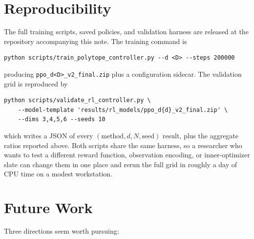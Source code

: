 \documentclass[11pt]{article}
\begin{document}
\section{Reproducibility}

The full training scripts, saved policies, and validation harness
are released at the repository accompanying this note.  The
training command is
\begin{verbatim}
python scripts/train_polytope_controller.py --d <D> --steps 200000
\end{verbatim}
producing \texttt{ppo\_d<D>\_v2\_final.zip} plus a configuration
sidecar.  The validation grid is reproduced by
\begin{verbatim}
python scripts/validate_rl_controller.py \
    --model-template 'results/rl_models/ppo_d{d}_v2_final.zip' \
    --dims 3,4,5,6 --seeds 10
\end{verbatim}
which writes a JSON of every $(\text{method}, d, N, \text{seed})$
result, plus the aggregate ratios reported above.  Both scripts
share the same harness, so a researcher who wants to test a
different reward function, observation encoding, or inner-optimizer
slate can change them in one place and rerun the full grid in
roughly a day of CPU time on a modest workstation.

\section{Future Work}

Three directions seem worth pursuing:
\end{document}

